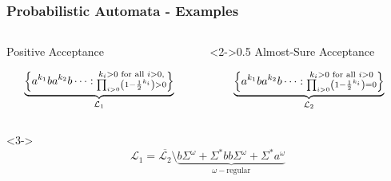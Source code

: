 \documentclass{beamer}
\begin{document}
  \begin{frame}
    \frametitle{Probabilistic Automata - Examples}
    \begin{columns}
      \begin{column}{0.5\textwidth}
        \small{Positive Acceptance}
        \begin{center}
        \end{center}
        \begin{equation*}
          \underbrace{
              \left\{a^{k_{1}}ba^{k_{2}}b\dots:
              \substack{k_{i}>0\text{ for all }i>0,\\
              \prod_{i>0}\left(1-\frac{1}{2}^{k_{i}}\right) > 0}
            \right\}
          }_{\mathcal{L}_{1}}
        \end{equation*}
      \end{column}
      \begin{column}<2->{0.5\textwidth}
        \small{Almost-Sure Acceptance}
        \begin{center}
        \end{center}
        \begin{equation*}
          \underbrace{
            \left\{
              a^{k_{1}}ba^{k_{2}}b\dots:
              \substack{k_{i}>0\text{ for all }i>0\\
              \prod_{i>0}\left(1-\frac{1}{2}^{k_{i}}\right) = 0}
            \right\}
          }_{\mathcal{L}_{2}}
        \end{equation*}
      \end{column}
    \end{columns}
    \begin{uncoverenv}<3->
      \begin{equation*}
        \mathcal{L}_{1} = \overline{\mathcal{L}_{2}}\setminus\underbrace{
          b\Sigma^{\omega} + \Sigma^{*}bb\Sigma^{\omega} + \Sigma^{*}a^{\omega}
        }_{\omega-\text{regular}}
      \end{equation*}
    \end{uncoverenv}
  \end{frame}
\end{document}
